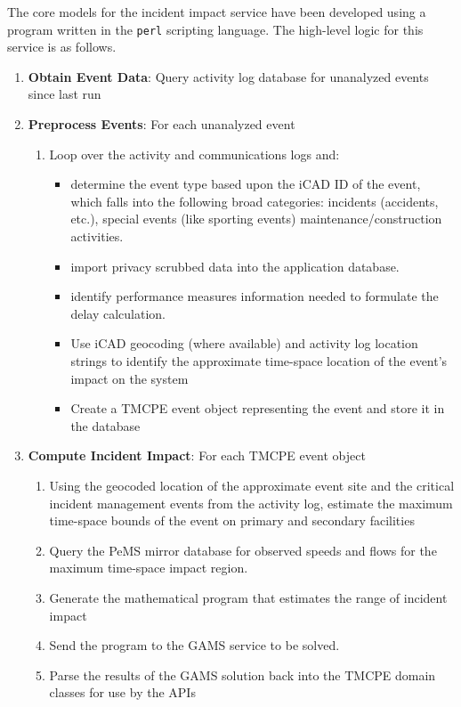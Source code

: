\documentclass[12pt]{report}
\renewcommand{\fixme}[3][]{#1\xspace}
\newcounter{time}
\newcounter{space}
\begin{document}
The core models for the incident impact service have been developed using a
program written in the \texttt{perl} scripting language.  The high-level logic
for this service is as follows.
\begin{enumerate}
\item {\sc \textbf{Obtain Event Data}}: Query activity log database
  for unanalyzed events since last run
\item {\sc\textbf{Preprocess Events}}: For each unanalyzed event
  \begin{enumerate}
  \item Loop over the activity and communications logs and:
    \begin{itemize}
    \item determine the event type based upon the \ac{iCAD} ID of the event,
      which falls into the following broad categories: incidents (accidents,
      etc.), special events (like sporting events) 
      maintenance/construction activities.
    \item import privacy scrubbed data into the application database.
    \item identify performance measures information needed to
      formulate the delay calculation.
    \item Use \ac{iCAD} geocoding (where available) and activity log
      location strings to identify the approximate time-space
      location of the event's impact on the
      system
    \item Create a \ac{TMCPE} event object representing the event and
      store it in the database
    \end{itemize}
  \end{enumerate}
\item {\sc\textbf{Compute Incident Impact}}: For each \ac{TMCPE} event object
  \begin{enumerate}
  \item Using the geocoded location of the approximate event site and
    the critical incident management events from the activity log,
    \fixme[estimate the maximum time-space bounds]{crindt}{more
      detail} of the event on primary and secondary facilities
  \item Query the \ac{PeMS} mirror database for observed speeds and flows
    for the maximum time-space impact region.
  \item Generate the mathematical program that estimates the range
    of incident impact
  \item Send the program to the \fixme[\ac{GAMS} service]{crindt}{explain} to
    be solved.
  \item Parse the results of the GAMS solution back into the \ac{TMCPE}
    domain classes for use by the \acp{API}
  \end{enumerate}
\end{enumerate}
\end{document}

